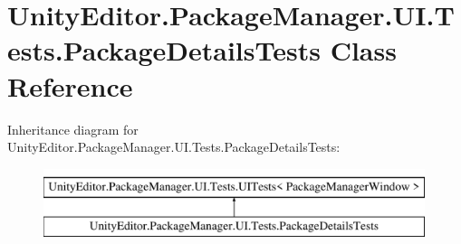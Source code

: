 \hypertarget{class_unity_editor_1_1_package_manager_1_1_u_i_1_1_tests_1_1_package_details_tests}{}\section{Unity\+Editor.\+Package\+Manager.\+U\+I.\+Tests.\+Package\+Details\+Tests Class Reference}
\label{class_unity_editor_1_1_package_manager_1_1_u_i_1_1_tests_1_1_package_details_tests}
Inheritance diagram for Unity\+Editor.\+Package\+Manager.\+U\+I.\+Tests.\+Package\+Details\+Tests\+:\begin{figure}[H]
\begin{center}
\leavevmode
\includegraphics[height=2.000000cm]{class_unity_editor_1_1_package_manager_1_1_u_i_1_1_tests_1_1_package_details_tests}
\end{center}
\end{figure}
